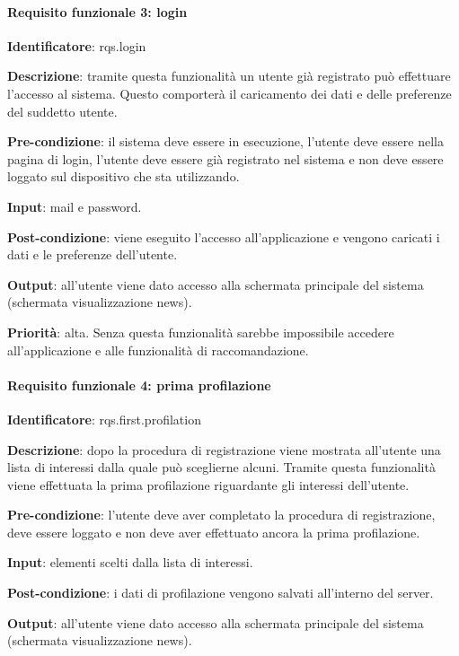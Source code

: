 \documentclass[12pt]{article}
\begin{document}
\paragraph{Requisito funzionale 3: login}

\textbf{Identificatore}: rqs.login

\textbf{Descrizione}: tramite questa funzionalità un utente già registrato può effettuare l’accesso al sistema. Questo comporterà il caricamento dei dati e delle preferenze del suddetto utente.

\textbf{Pre-condizione}: il sistema deve essere in esecuzione, l’utente deve essere nella pagina di login, l’utente deve essere già registrato nel sistema e non deve essere loggato sul dispositivo che sta utilizzando.

\textbf{Input}: mail e password.

\textbf{Post-condizione}: viene eseguito l’accesso all’applicazione e vengono caricati i dati e le preferenze dell’utente.

\textbf{Output}: all’utente viene dato accesso alla schermata principale del sistema (schermata visualizzazione news).

\textbf{Priorità}: alta. Senza questa funzionalità sarebbe impossibile accedere all’applicazione e alle funzionalità di raccomandazione.

\paragraph{Requisito funzionale 4: prima profilazione}

\textbf{Identificatore}: rqs.first.profilation

\textbf{Descrizione}: dopo la procedura di registrazione viene mostrata all’utente una lista di interessi dalla quale può sceglierne alcuni. Tramite questa funzionalità viene effettuata la prima profilazione riguardante gli interessi dell’utente.

\textbf{Pre-condizione}: l’utente deve aver completato la procedura di registrazione, deve essere loggato e non deve aver effettuato ancora la prima profilazione.

\textbf{Input}: elementi scelti dalla lista di interessi.

\textbf{Post-condizione}: i dati di profilazione vengono salvati all’interno del server.

\textbf{Output}: all’utente viene dato accesso alla schermata principale del sistema (schermata visualizzazione news).
\end{document}
